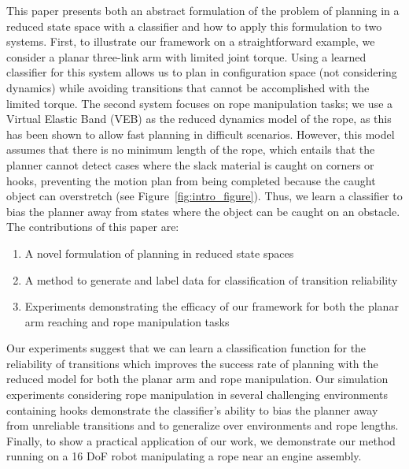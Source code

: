 This paper presents both an abstract formulation of the problem of planning in a reduced state space with a classifier and how to apply this formulation to two systems. First, to illustrate our framework on a straightforward example, we consider a planar three-link arm with limited joint torque. Using a learned classifier for this system allows us to plan in configuration space (not considering dynamics) while avoiding transitions that cannot be accomplished with the limited torque. The second system focuses on rope manipulation tasks; we use a Virtual Elastic Band (VEB) \cite{McConachie2017} as the reduced dynamics model of the rope, as this has been shown to allow fast planning in difficult scenarios. However, this model assumes that there is no minimum length of the rope, which entails that the planner cannot detect cases where the slack material is caught on corners or hooks, preventing the motion plan from being completed because the caught object can overstretch (see Figure~\ref{fig:intro_figure}). Thus, we learn a classifier to bias the planner away from states where the object can be caught on an obstacle.
The contributions of this paper are:
\begin{enumerate}
    \item A novel formulation of planning in reduced state spaces
    \item A method to generate and label data for classification of transition reliability
    \item Experiments demonstrating the efficacy of our framework for both the planar arm reaching and rope manipulation tasks
\end{enumerate}

Our experiments suggest that we can learn a classification function for the reliability of transitions which improves the success rate of planning with the reduced model for both the planar arm and rope manipulation. Our simulation experiments considering rope manipulation in several challenging environments containing hooks demonstrate the classifier's ability to bias the planner away from unreliable transitions and to generalize over environments and rope lengths. %
Finally, to show a practical application of our work, we demonstrate our method running on a 16 DoF robot manipulating a rope near an engine assembly.

